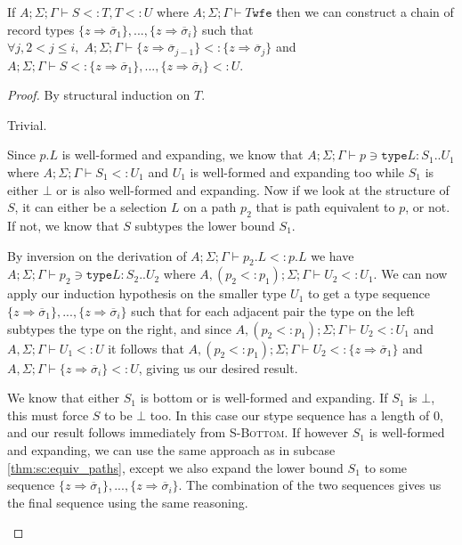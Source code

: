 \documentclass{llncs}
\numberwithin{subsubcase}{subcase}
\numberwithin{subcase}{casethm}
\numberwithin{casethm}{theorem}
\numberwithin{casethm}{lemma}
\begin{document}
\begin{lemma} \label{lem:transitivity}
If 	$A; \Sigma; \Gamma \vdash S <: T, T <: U$ where
	$A; \Sigma; \Gamma \vdash T \texttt{wfe}$ then 
	we can construct a chain of record types 
	$\{z \Rightarrow \overline{\sigma}_1\}, ..., \{z \Rightarrow \overline{\sigma}_i\}$
	such that $\forall j, 2 < j \leq i, \; 
	A; \Sigma; \Gamma \vdash \{z \Rightarrow \overline{\sigma}_{j-1}\} <: \{z \Rightarrow \overline{\sigma}_{j}\}$
	and
	$A; \Sigma; \Gamma \vdash S <: \{z \Rightarrow \overline{\sigma}_1\}, ..., \{z \Rightarrow \overline{\sigma}_i\} <:U$.
\end{lemma}
\begin{proof}
By structural induction on $T$.

\begin{casethm}[T = $\{z \Rightarrow \overline{\sigma}\}$]
Trivial.
\end{casethm}

\begin{casethm}[T = $p.L$]
Since $p.L$ is well-formed and expanding, we know that 
$A; \Sigma; \Gamma \vdash p \ni \texttt{type} L : S_1 .. U_1$ 
where $A; \Sigma; \Gamma \vdash S_1 <: U_1$ and $U_1$ is 
well-formed and expanding too while $S_1$ is either $\bot$ 
or is also well-formed and expanding. Now if we look at the 
structure of $S$, it can either be a selection $L$ on a path $p_2$ 
that is path equivalent to $p$, or not. If not, we know that 
$S$ subtypes the lower bound $S_1$.
\begin{subcase}[$S_2 = p_2.L$ and $p_2 \equiv p$] \label{thm:sc:equiv_paths}
By inversion on the derivation of $A; \Sigma; \Gamma \vdash p_2.L <: p.L$ 
we have $A; \Sigma; \Gamma \vdash p_2 \ni \texttt{type} L : S_2 .. U_2$ where 
$A, (p_2 <: p_1); \Sigma; \Gamma \vdash U_2 <: U_1$. 
We can now apply our induction hypothesis on the smaller type $U_1$ 
to get a type sequence 
$\{z \Rightarrow \overline{\sigma}_1\}, ..., \{z \Rightarrow \overline{\sigma}_i\}$ 
such that for each adjacent pair the type on the left subtypes  the type on the 
right, and since $A, (p_2 <: p_1); \Sigma; \Gamma \vdash U_2 <: U_1$ and
$A, \Sigma; \Gamma \vdash U_1 <: U$ it follows that 
$A, (p_2 <: p_1); \Sigma; \Gamma \vdash U_2 <: \{z \Rightarrow \overline{\sigma}_1\}$ and
$A, \Sigma; \Gamma \vdash \{z \Rightarrow \overline{\sigma}_i\} <: U$, giving us
our desired result.
\end{subcase}
\begin{subcase}[$S$ subtypes $S_1$]
We know that either $S_1$ is bottom or is well-formed 
and expanding. If $S_1$ is $\bot$, this must force $S$ 
to be $\bot$ too. In this case our stype sequence has a 
length of 0, and our result follows immediately from 
\textsc{S-Bottom}. If however $S_1$ is well-formed and 
expanding, we can use the same approach as in subcase 
\ref{thm:sc:equiv_paths}, except we also expand the lower 
bound $S_1$ to some sequence 
$\{z \Rightarrow \overline{\sigma}_1\}, ..., \{z \Rightarrow \overline{\sigma}_i\}$. The combination of the two sequences gives us the final sequence using the same reasoning.
\end{subcase}
\end{casethm}


\end{proof}
\end{document}
